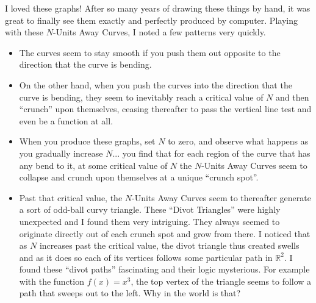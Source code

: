 I loved these graphs! After so many years of drawing these things by hand, it was great to finally see them exactly and perfectly produced by computer. Playing with these $N$-Units Away Curves, I noted a few patterns very quickly.

\begin{itemize}
    \item The curves seem to stay smooth if you push them out opposite to the direction that the curve is bending.
    \item On the other hand, when you push the curves into the direction that the curve is bending, they seem to inevitably reach a critical value of $N$ and then ``crunch'' upon themselves, ceasing thereafter to pass the vertical line test and even be a function at all.
    \item When you produce these graphs, set $N$ to zero, and observe what happens as you gradually increase $N$... you find that for each region of the curve that has any bend to it, at some critical value of $N$ the $N$-Units Away Curves seem to collapse and crunch upon themselves at a unique ``crunch spot''.
    \item Past that critical value, the $N$-Units Away Curves seem to thereafter generate a sort of odd-ball curvy triangle. These ``Divot Triangles'' were highly unexpected and I found them very intriguing. They always seemed to originate directly out of each crunch spot and grow from there. I noticed that as $N$ increases past the critical value, the divot triangle thus created swells and as it does so each of its vertices follows some particular path in $\mathbb{R}^2$. I found these ``divot paths'' fascinating and their logic mysterious. For example with the function $f(x) = x^3$, the top vertex of the triangle seems to follow a path that sweeps out to the left. Why in the world is that?
\end{itemize}

